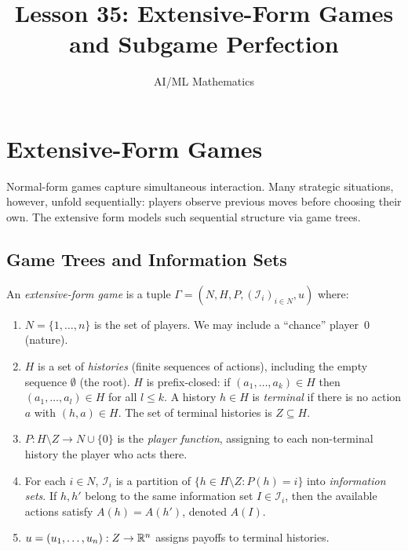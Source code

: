 \documentclass[11pt,a4paper]{article}
\title{Lesson 35: Extensive-Form Games and Subgame Perfection}
\author{AI/ML Mathematics}
\date{}
\begin{document}
\maketitle
\tableofcontents
\newpage


\section{Extensive-Form Games}
\label{sec:extensive}

Normal-form games capture simultaneous interaction. Many strategic
situations, however, unfold sequentially: players observe previous moves
before choosing their own. The extensive form models such sequential
structure via game trees.

\subsection{Game Trees and Information Sets}
\label{subsec:game_trees}

\begin{definition}
\label{def:extensive}
An \emph{extensive-form game} is a tuple
$\Gamma = (N, H, P, (\mathcal{I}_i)_{i \in N}, u)$ where:
\begin{enumerate}[nosep,label=(\roman*)]
    \item $N = \{1, \ldots, n\}$ is the set of players. We may include a
    ``chance'' player~$0$ (nature).
    \item $H$ is a set of \emph{histories} (finite sequences of actions),
    including the empty sequence $\emptyset$ (the root). $H$ is prefix-closed:
    if $(a_1, \ldots, a_k) \in H$ then $(a_1, \ldots, a_l) \in H$ for all
    $l \leq k$. A history $h \in H$ is \emph{terminal} if there is no action
    $a$ with $(h, a) \in H$. The set of terminal histories is $Z \subseteq H$.
    \item $P : H \setminus Z \to N \cup \{0\}$ is the \emph{player function},
    assigning to each non-terminal history the player who acts there.
    \item For each $i \in N$, $\mathcal{I}_i$ is a partition of
    $\{h \in H \setminus Z : P(h) = i\}$ into \emph{information sets}. If
    $h, h'$ belong to the same information set $I \in \mathcal{I}_i$, then
    the available actions satisfy $A(h) = A(h')$, denoted $A(I)$.
    \item $u = (u_1, \ldots, u_n) : Z \to \mathbb{R}^n$ assigns payoffs to terminal
    histories.
\end{enumerate}
\end{definition}
\end{document}

